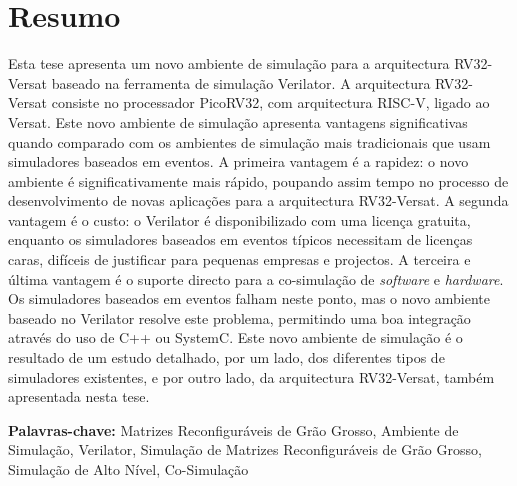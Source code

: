 
\section*{Resumo}


Esta tese apresenta um novo ambiente de simulação para a arquitectura RV32-Versat baseado 
na ferramenta de simulação Verilator. A arquitectura RV32-Versat consiste no processador 
PicoRV32, com arquitectura RISC-V, ligado ao Versat. Este novo ambiente de 
simulação apresenta vantagens significativas quando comparado com os ambientes de 
simulação mais tradicionais que usam simuladores baseados em eventos. A primeira vantagem 
é a rapidez: o novo ambiente é significativamente mais rápido, poupando assim tempo no 
processo de desenvolvimento de novas aplicações para a arquitectura RV32-Versat. A 
segunda vantagem é o custo: o Verilator é disponibilizado com uma licença gratuita, 
enquanto os simuladores baseados em eventos típicos necessitam de licenças caras, 
difíceis de justificar para pequenas empresas e projectos. A terceira e última vantagem é 
o suporte directo para a co-simulação de \textit{software} e \textit{hardware}. Os 
simuladores baseados em eventos falham neste ponto, mas o novo ambiente baseado no 
Verilator resolve este problema, permitindo uma boa integração através do uso de C++ ou 
SystemC. Este novo ambiente de simulação é o resultado de um estudo detalhado, por um 
lado, dos diferentes tipos de simuladores existentes, e por outro lado, da arquitectura 
RV32-Versat, também apresentada nesta tese.

\vfill

\textbf{\Large Palavras-chave:} Matrizes Reconfiguráveis de Grão Grosso, Ambiente de 
Simulação, Verilator, Simulação de Matrizes Reconfiguráveis de Grão Grosso, Simulação de 
Alto Nível, Co-Simulação


